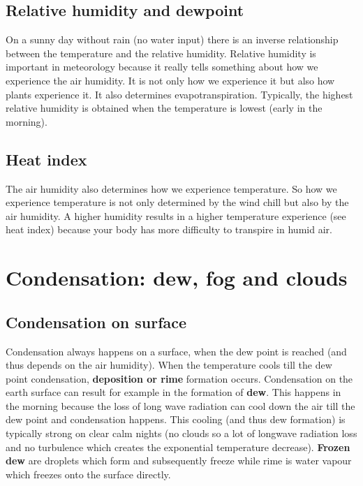 \documentclass[oneside]{book}
\begin{document}
\subsection{Relative humidity and
dewpoint}\label{relative-humidity-and-dewpoint}

On a sunny day without rain (no water input) there is an inverse
relationship between the temperature and the relative humidity. Relative
humidity is important in meteorology because it really tells something
about how we experience the air humidity. It is not only how we
experience it but also how plants experience it. It also determines
evapotranspiration. Typically, the highest relative humidity is obtained
when the temperature is lowest (early in the morning).

\subsection{Heat index}\label{heat-index}

The air humidity also determines how we experience temperature. So how
we experience temperature is not only determined by the wind chill but
also by the air humidity. A higher humidity results in a higher
temperature experience (see heat index) because your body has more
difficulty to transpire in humid air.

\section{Condensation: dew, fog and
clouds}\label{condensation-dew-fog-and-clouds}

\subsection{Condensation on surface}\label{condensation-on-surface}

Condensation always happens on a surface, when the dew point is reached
(and thus depends on the air humidity). When the temperature cools till
the dew point condensation, \textbf{deposition or rime} formation
occurs. Condensation on the earth surface can result for example in the
formation of \textbf{dew}. This happens in the morning because the loss
of long wave radiation can cool down the air till the dew point and
condensation happens. This cooling (and thus dew formation) is typically
strong on clear calm nights (no clouds so a lot of longwave radiation
loss and no turbulence which creates the exponential temperature
decrease). \textbf{Frozen dew} are droplets which form and subsequently
freeze while rime is water vapour which freezes onto the surface
directly.
\end{document}
